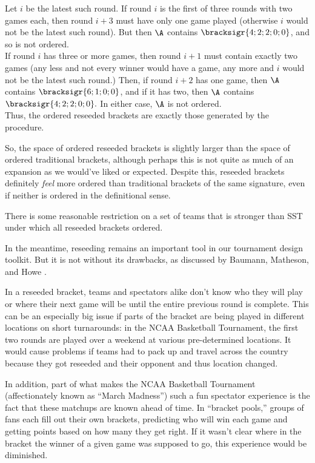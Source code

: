{{    Let $i$ be the latest such round. If round $i$ is the first of three rounds with two games each, then round $i+3$ must have only one game played (otherwise $i$ would not be the latest such round). But then $\A$ contains $\bracksigr{4;2;2;0;0}$, and so is not ordered.\\
    
    If round $i$ has three or more games, then round $i+1$ must contain exactly two games (any less and not every winner would have a game, any more and $i$ would not be the latest such round.) Then, if round $i+2$ has one game, then $\A$ contains $\bracksigr{6;1;0;0}$, and if it has two, then $\A$ contains $\bracksigr{4;2;2;0;0}.$ In either case, $\A$ is not ordered.\\

    Thus, the ordered reseeded brackets are exactly those generated by the procedure.
}{}

So, the space of ordered reseeded brackets is slightly larger than the space of ordered traditional brackets, although perhaps this is not quite as much of an expansion as we would've liked or expected. Despite this, reseeded brackets definitely \textit{feel} more ordered than traditional brackets of the same signature, even if neither is ordered in the definitional sense.

\begin{conj}{}{}
    There is some reasonable restriction on a set of teams that is stronger than SST under which all reseeded brackets ordered.
\end{conj}

In the meantime, reseeding remains an important tool in our tournament design toolkit. But it is not without its drawbacks, as discussed by Baumann, Matheson, and Howe \cite{reseeding_issues}. 

In a reseeded bracket, teams and spectators alike don't know who they will play or where their next game will be until the entire previous round is complete. This can be an especially big issue if parts of the bracket are being played in different locations on short turnarounds: in the NCAA Basketball Tournament, the first two rounds are played over a weekend at various pre-determined locations. It would cause problems if teams had to pack up and travel across the country because they got reseeded and their opponent and thus location changed.

In addition, part of what makes the NCAA Basketball Tournament (affectionately known as ``March Madness'') such a fun spectator experience is the fact that these matchups are known ahead of time. In ``bracket pools,'' groups of fans each fill out their own brackets, predicting who will win each game and getting points based on how many they get right. If it wasn't clear where in the bracket the winner of a given game was supposed to go, this experience would be diminished.

}

